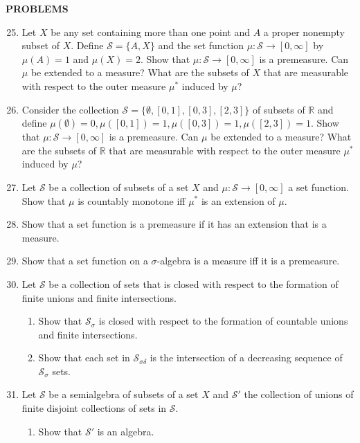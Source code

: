 \begin{center}
	\textbf{PROBLEMS}
\end{center}
\begin{enumerate}
	\setcounter{enumi}{24}
	\item Let $X$ be any set containing more than one point and $A$ a proper nonempty subset of $X$.
	Define $\mathcal{S}=\{A,X\}$ and the set function $\mu:\mathcal{S}\to[0,\infty]$ by $\mu(A)=1$ and $\mu(X)=2$.
	Show that $\mu:\mathcal{S}\to[0,\infty]$ is a premeasure.
	Can $\mu$ be extended to a measure?
	What are the subsets of $X$ that are measurable with respect to the outer measure $\mu^*$ induced by $\mu$?
	\item Consider the collection $\mathcal{S}=\{\emptyset,[0,1],[0,3],[2,3]\}$ of subsets of $\mathbb{R}$ and define $\mu(\emptyset)=0,\mu([0,1])=1,\mu([0,3])=1,\mu([2,3])=1$.
	Show that $\mu:\mathcal{S}\to[0,\infty]$ is a premeasure.
	Can $\mu$ be extended to a measure?
	What are the subsets of $\mathbb{R}$ that are measurable with respect to the outer measure $\mu^*$ induced by $\mu$?
	\item Let $\mathcal{S}$ be a collection of subsets of a set $X$ and $\mu:\mathcal{S}\to[0,\infty]$ a set function.
	Show that $\mu$ is countably monotone iff $\mu^*$ is an extension of $\mu$.
	\item Show that a set function is a premeasure if it has an extension that is a measure.
	\item Show that a set function on a $\sigma$-algebra is a measure iff it is a premeasure.
	\item Let $\mathcal{S}$ be a collection of sets that is closed with respect to the formation of finite unions and finite intersections.
	\begin{enumerate}[label=(\roman*),align=left]  
		\item Show that $\mathcal{S}_\sigma$ is closed with respect to the formation of countable unions and finite intersections.
		\item Show that each set in $\mathcal{S}_{\sigma\delta}$ is the intersection of a decreasing sequence of $\mathcal{S}_\sigma$ sets.
	\end{enumerate}
	\item Let $\mathcal{S}$ be a semialgebra of subsets of a set $X$ and $\mathcal{S}'$ the collection of unions of finite disjoint collections of sets in $\mathcal{S}$.
	\begin{enumerate}[label=(\roman*),align=left]  
		\item Show that $\mathcal{S}'$ is an algebra.

\end{enumerate}
\end{enumerate}
